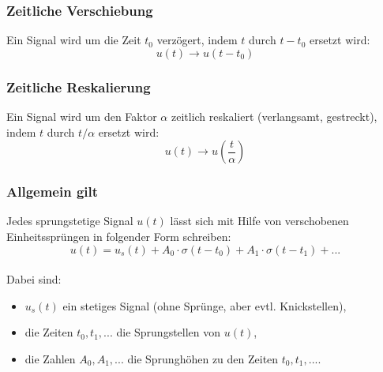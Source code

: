 \subsubsection{Zeitliche Verschiebung}
Ein Signal wird um die Zeit $t_0$ verzögert, indem $t$ durch $t-t_0$ ersetzt wird:
\[
	u(t) \rightarrow u(t-t_0)
\]

\subsubsection{Zeitliche Reskalierung}
Ein Signal wird um den Faktor $\alpha$ zeitlich reskaliert (verlangsamt, gestreckt), indem $t$ durch $t/\alpha$ ersetzt wird:
\[
	u(t) \rightarrow u \left( \frac{t}{\alpha} \right)
\]

\subsubsection{Allgemein gilt}
Jedes sprungstetige Signal $u(t)$ lässt sich mit Hilfe von verschobenen Einheitssprüngen in folgender Form schreiben:
\[
	u(t) = u_s(t) + A_0 \cdot \sigma(t-t_0) + A_1 \cdot \sigma(t-t_1)+ ...
\]
\\
Dabei sind:
\begin{itemize}
	\item $u_s(t)$ ein stetiges Signal (ohne Sprünge, aber evtl. Knickstellen),
	\item die Zeiten $t_0,t_1,...$ die Sprungstellen von $u(t)$,
	\item die Zahlen $A_0,A_1,...$ die Sprunghöhen zu den Zeiten $t_0,t_1,...$.
\end{itemize}